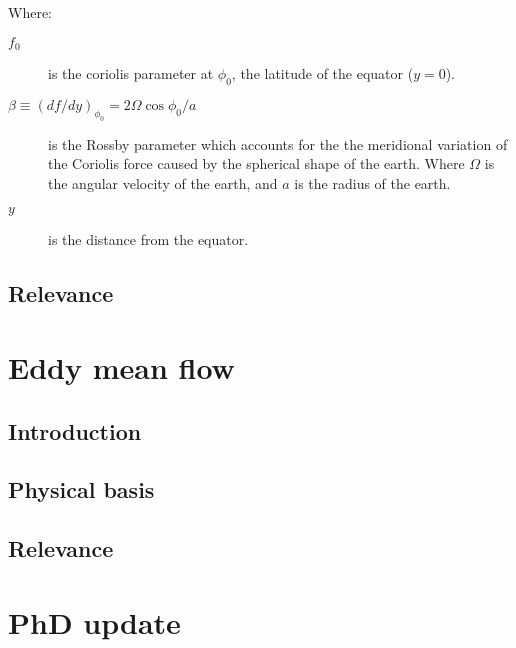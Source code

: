 \documentclass{article}
\begin{document}
Where:

\begin{description}
    \item[$f_0$] is the coriolis parameter at $\phi_0$, the latitude of the equator ($y=0$).
    \item[$\beta \equiv (df/dy)_{\phi_0} = 2 \Omega \cos{\phi_0/a}$]  is the Rossby parameter which accounts for the the meridional variation of the Coriolis force caused by the spherical shape of the earth. Where $\Omega$ is the angular velocity of the earth, and $a$ is the radius of the earth.
    \item[$y$] is the distance from the equator.
\end{description}


\subsection*{Relevance}


\section*{Eddy mean flow}

\subsection*{Introduction}


\subsection*{Physical basis}


\subsection*{Relevance}


\section*{PhD update}





\printbibliography
\end{document}

